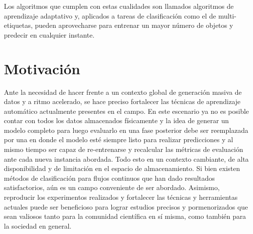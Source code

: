 Los algoritmos que cumplen con estas cualidades son llamados algoritmos de
aprendizaje adaptativo y, aplicados a tareas de clasificación como el de
multi-etiquetas, pueden aprovecharse para entrenar un mayor número de objetos y
predecir en cualquier instante. 


\section{Motivación} 

Ante la necesidad de hacer frente a un contexto global de generación masiva de
datos y a ritmo acelerado, se hace preciso fortalecer las técnicas de
aprendizaje automático actualmente presentes en el campo. En este escenario ya
no es posible contar con todos los datos almacenados físicamente y la idea de
generar un modelo completo para luego evaluarlo en una fase posterior debe ser
reemplazada por una en donde el modelo esté siempre listo para realizar
predicciones y al mismo tiempo ser capaz de re-entrenarse y recalcular las
métricas de evaluación ante cada nueva instancia abordada. Todo esto en un
contexto cambiante, de alta disponibilidad y de limitación en el espacio de
almacenamiento. Si bien existen métodos de clasificación para flujos continuos
que han dado resultados satisfactorios, aún es un campo conveniente de ser
abordado. Asimismo, reproducir los experimentos realizados y fortalecer las
técnicas y herramientas actuales puede ser beneficioso para lograr estudios
precisos y pormenorizados que sean valiosos tanto para la comunidad científica
en sí misma, como también para la sociedad en general.

